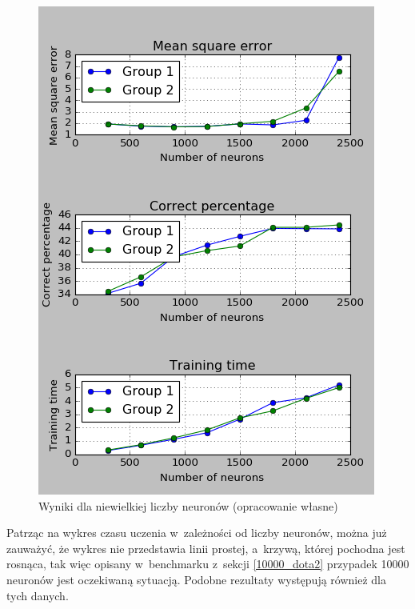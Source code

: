 \documentclass[pl]{minipw} %
\begin{document}
\begin{figure}[H]
\centering
\includegraphics[width=\textwidth]{wyniki_forest_python.png}
\caption[Wyniki dla niewielkiej liczby neuronów]{Wyniki dla niewielkiej liczby neuronów (opracowanie własne)}
\label{forest_python}
\end{figure}
Patrząc na wykres czasu uczenia w~zależności od liczby neuronów, można już zauważyć, że wykres nie przedstawia linii prostej, a~krzywą, której pochodna jest rosnąca, tak więc opisany w~benchmarku z~sekcji \ref{10000_dota2} przypadek 10000 neuronów jest oczekiwaną sytuacją. Podobne rezultaty występują również dla tych danych.
\end{document}
